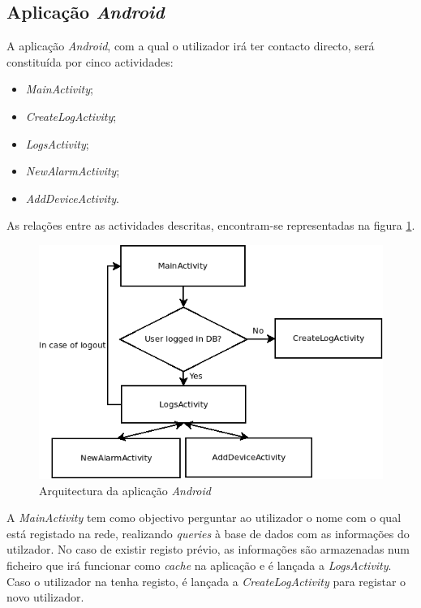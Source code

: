 \documentclass[a4paper]{article}
\begin{document}
\subsection{Aplicação \textit{Android}}

A aplicação \textit{Android}, com a qual o utilizador irá ter contacto directo, será constituída por cinco actividades:

\begin{itemize}
\item \textit{MainActivity};
\item \textit{CreateLogActivity};
\item \textit{LogsActivity};
\item \textit{NewAlarmActivity};
\item \textit{AddDeviceActivity}.
\end{itemize}

As relações entre as actividades descritas, encontram-se representadas na figura \ref{fig:app_android_geral}.

\vspace{5mm}

\begin{figure}[hb]
  \centering
  \includegraphics[scale=0.40]{App_geral.png}
  \caption{Arquitectura da aplicação \textit{Android}}
  \label{fig:app_android_geral}
\end{figure}

A \textit{MainActivity} tem como objectivo perguntar ao utilizador o nome com o qual está registado na rede, realizando \textit{queries} à base de dados com as informações do utilzador. No caso de existir registo prévio, as informações são armazenadas num ficheiro que irá funcionar como \textit{cache} na aplicação e é lançada a \textit{LogsActivity}. Caso o utilizador na tenha registo, é lançada a \textit{CreateLogActivity} para registar o novo utilizador. 
\end{document}
